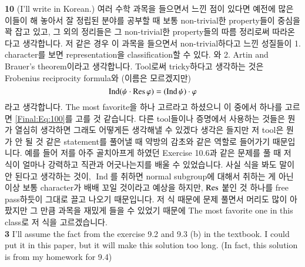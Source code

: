 \documentclass[a4paper, 12pt]{article}
\theoremstyle{Mydefinition}
\theoremstyle{Mytheorem}
\DeclareMathOperator{\Ind}{Ind}
\begin{document}
\noindent \textbf{10}
(I'll write in Korean.)
여러 수학 과목을 들으면서 느낀 점이 있다면 예전에 많은 이들이 해 놓아서 잘 정립된 분야를 공부할 때 보통 non-trivial한 property들이 중심을 꽉 잡고 있고, 그 외의 정리들은 그 non-trivial한 property들의 따름 정리로써 따라온다고 생각합니다. 저 같은 경우 이 과목을 들으면서 non-trivial하다고 느낀 성질들이 1. character를 보면 representation을 classification할 수 있다. 와 2. Artin and Brauer's theorem이라고 생각합니다. Tool로써 tricky하다고 생각하는 것은 Frobenius reciprocity formula와 (이름은 모르겠지만)
\begin{equation}\label{Final:Eq:100}
    \Ind(\psi\cdot \Res\varphi) = (\Ind\psi)\cdot \varphi
\end{equation}
라고 생각합니다. The most favorite을 하나 고르라고 하셨으니 이 중에서 하나를 고르면 \eqref{Final:Eq:100}를 고를 것 같습니다. 다른 tool들이나 증명에서 사용하는 것들은 뭔가 열심히 생각하면 그래도 어떻게든 생각해낼 수 있겠다 생각은 들지만 저 tool은 뭔가 안 될 것 같은 statement를 풀어낼 때 약방의 감초와 같은 역할로 들어가기 때문입니다. 예를 들어 저를 아주 골치아프게 하였던 Exercise 10.6과 같은 문제를 풀 때 저 식이 얼마나 강력하고 직관과 어긋나는지를 배울 수 있었습니다. 사실 식을 봐도 말이 안 된다고 생각하는 것이, $\Ind$를 취하면 normal subgroup에 대해서 취하는 게 아닌 이상 보통 character가 배배 꼬일 것이라고 예상을 하지만, $\Res$ 붙인 것 하나를 free pass하듯이 그대로 끌고 나오기 때문입니다. 저 식 때문에 문제 풀면서 머리도 많이 아팠지만 그 만큼 과목을 재밌게 들을 수 있었기 때문에 The most favorite one in this class로 저 식을 고르겠습니다.\\


\noindent \textbf{3}
I'll assume the fact from the exercise 9.2 and 9.3 (b) in the textbook. I could put it in this paper, but it will make this solution too long. (In fact, this solution is from my homework for 9.4)
\end{document}
